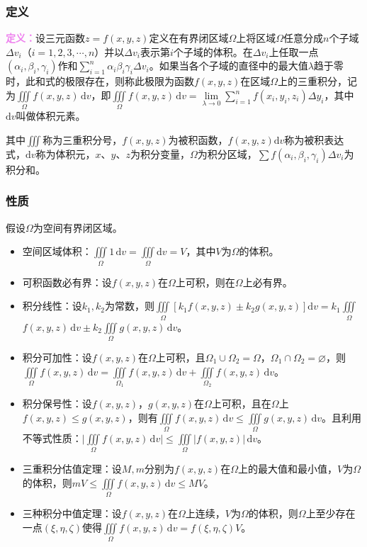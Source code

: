 \subsubsection{定义}

\textcolor{violet}{\textbf{定义：}}设三元函数$z=f(x,y,z)$定义在有界闭区域$\Omega$上将区域$\Omega$任意分成$n$个子域$\Delta v_i$（$i=1,2,3,\cdots,n$）并以$\Delta v_i$表示第$i$个子域的体积。在$\Delta v_i$上任取一点$(\alpha_i,\beta_i,\gamma_i)$作和$\sum\limits_{i=1}^n\alpha_i\beta_i\gamma_i\Delta v_i$。如果当各个子域的直径中的最大值$\lambda$趋于零时，此和式的极限存在，则称此极限为函数$f(x,y,z)$在区域$\Omega$上的三重积分，记为$\iiint\limits_\Omega f(x,y,z)\,\textrm{d}v$，即$\iiint\limits_\Omega f(x,y,z)\,\textrm{d}v=\lim\limits_{\lambda\to0}\sum\limits_{i=1}^nf(x_i,y_i,z_i)\Delta y_i$，其中$\textrm{d}v$叫做体积元素。

其中$\iiint$称为三重积分号，$f(x,y,z)$为被积函数，$f(x,y,z)\textrm{d}v$称为被积表达式，$\textrm{d}v$称为体积元，$x$、$y$、$z$为积分变量，$\Omega$为积分区域，$\sum f(\alpha_i,\beta_i,\gamma_i)\Delta v_i$为积分和。

\subsubsection{性质}

假设$\Omega$为空间有界闭区域。

\begin{itemize}
    \item 空间区域体积：$\iiint\limits_\Omega1\,\textrm{d}v=\iiint\limits_\Omega\textrm{d}v=V$，其中$V$为$\Omega$的体积。
    \item 可积函数必有界：设$f(x,y,z)$在$\Omega$上可积，则在$\Omega$上必有界。
    \item 积分线性：设$k_1,k_2$为常数，则$\iiint\limits_\Omega[k_1f(x,y,z)\pm k_2g(x,y,z)]\textrm{d}v=k_1\iiint\limits_\Omega$\\$f(x,y,z)\,\textrm{d}v\pm k_2\iiint\limits_\Omega g(x,y,z)\,\textrm{d}v$。
    \item 积分可加性：设$f(x,y,z)$在$\Omega$上可积，且$\Omega_1\cup\Omega_2=\Omega$，$\Omega_1\cap\Omega_2=\varnothing$，则$\iiint\limits_\Omega f(x,y,z)\,\textrm{d}v=\iiint\limits_{\Omega_1}f(x,y,z)\,\textrm{d}v+\iiint\limits_{\Omega_2}f(x,y,z)\,\textrm{d}v$。
    \item 积分保号性：设$f(x,y,z)$，$g(x,y,z)$在$\Omega$上可积，且在$\Omega$上$f(x,y,z)\leqslant g(x,y,z)$，则有$\iiint\limits_\Omega f(x,y,z)\,\textrm{d}v\leqslant\iiint\limits_\Omega g(x,y,z)\,\textrm{d}v$。且利用不等式性质：$\vert\iiint\limits_\Omega f(x,y,z)\,\textrm{d}v\vert\leqslant\iiint\limits_\Omega\vert f(x,y,z)\vert\,\textrm{d}v$。
    \item 三重积分估值定理：设$M,m$分别为$f(x,y,z)$在$\Omega$上的最大值和最小值，$V$为$\Omega$的体积，则$mV\leqslant\iiint\limits_\Omega f(x,y,z)\,\textrm{d}v\leqslant MV$。
    \item 三种积分中值定理：设$f(x,y,z)$在$\Omega$上连续，$V$为$\Omega$的体积，则$\Omega$上至少存在一点$(\xi,\eta,\zeta)$使得$\iiint\limits_\Omega f(x,y,z)\,\textrm{d}v=f(\xi,\eta,\zeta)V$。
\end{itemize}

